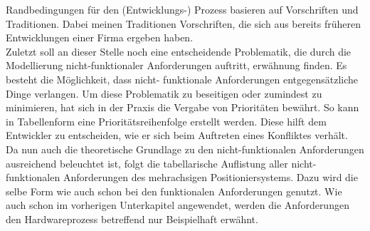 \documentclass[../../../Bachelorarbeit.tex]{subfiles}
\begin{document}
Randbedingungen für den (Entwicklungs-) Prozess basieren auf Vorschriften und Traditionen. Dabei meinen Traditionen Vorschriften, die sich aus bereits früheren Entwicklungen einer Firma ergeben haben.\\ %
Zuletzt soll an dieser Stelle noch eine entscheidende Problematik, die durch die Modellierung nicht-funktionaler Anforderungen auftritt, erwähnung finden. Es besteht die Möglichkeit, dass nicht- funktionale Anforderungen entgegensätzliche Dinge verlangen. Um diese Problematik zu beseitigen oder zumindest zu minimieren, hat sich in der Praxis die Vergabe von Prioritäten bewährt. So kann in Tabellenform eine Prioritätsreihenfolge erstellt werden. Diese hilft dem Entwickler zu entscheiden, wie er sich beim Auftreten eines Konfliktes verhält.\\ %
Da nun auch die theoretische Grundlage zu den nicht-funktionalen Anforderungen ausreichend beleuchtet ist, folgt die tabellarische Auflistung aller nicht-funktionalen Anforderungen des mehrachsigen Positioniersystems. Dazu wird die selbe Form wie auch schon bei den funktionalen Anforderungen genutzt. Wie auch schon im vorherigen Unterkapitel angewendet, werden die Anforderungen den Hardwareprozess betreffend nur Beispielhaft erwähnt.
\end{document}
